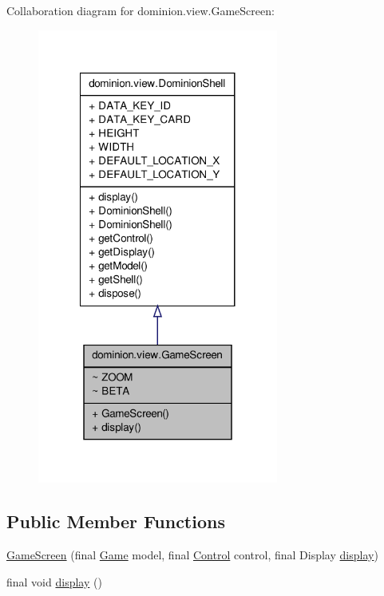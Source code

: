 \-Collaboration diagram for dominion.\-view.\-Game\-Screen\-:
\nopagebreak
\begin{figure}[H]
\begin{center}
\leavevmode
\includegraphics[width=224pt]{classdominion_1_1view_1_1GameScreen__coll__graph}
\end{center}
\end{figure}
\subsection*{\-Public \-Member \-Functions}
\begin{DoxyCompactItemize}
\item 
\hyperlink{classdominion_1_1view_1_1GameScreen_a87880889406c981315406b06c5c83da6}{\-Game\-Screen} (final \hyperlink{interfacedominion_1_1model_1_1Game}{\-Game} model, final \hyperlink{interfacedominion_1_1control_1_1Control}{\-Control} control, final \-Display \hyperlink{classdominion_1_1view_1_1GameScreen_a8b0b0ae6651bc24e24c56ed98d9ffb7b}{display})
\item 
final void \hyperlink{classdominion_1_1view_1_1GameScreen_a8b0b0ae6651bc24e24c56ed98d9ffb7b}{display} ()
\end{DoxyCompactItemize}
